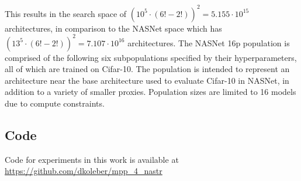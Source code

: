 \documentclass[twocolumn]{article}
\begin{document}
This results in the search space of $(10^{5}\cdot(6! - 2!))^{2} = 5.155\cdot10^{15}$ architectures, in comparison to the NASNet\cite{nasnet} space which
has $(13^{5}\cdot(6! - 2!))^{2} = 7.107\cdot10^{16}$ architectures.
The NASNet 16p population is comprised of the following six subpopulations specified by their hyperparameters, all of which are trained on Cifar-10.
The population is intended to represent an architecture near the base architecture used to evaluate Cifar-10 in NASNet\cite{nasnet}, in addition to a variety of smaller
proxies. Population sizes are limited to 16 models due to compute constraints.

\begin{table}[!h]
    \begin{center}
        \caption{NASNet 16p Subpopulation Configurations}
        \label{table:nasnet_details}
    \end{center}
\end{table}

\subsection{Code}

Code for experiments in this work is available at \url{https://github.com/dkoleber/mpp_4_nastr}
\end{document}
